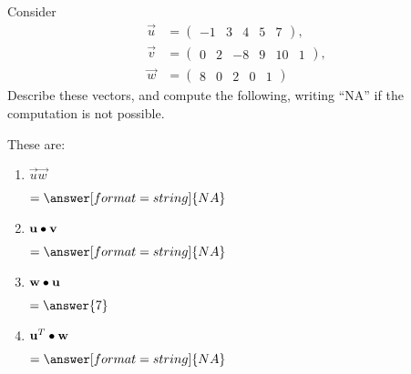 \documentclass{ximera}
\author{Parisa Fatheddin}
\begin{document}
\begin{exercise}

  Consider
  \begin{align*}
    \vec{u} &= \begin{pmatrix} -1 & 3 & 4 & 5 & 7
    \end{pmatrix},\\
    \vec{v} &= \begin{pmatrix}
      0 & 2 & -8 & 9 & 10 & 1
    \end{pmatrix},\\
    \vec{w} &= \begin{pmatrix}
      8 & 0 & 2 & 0 & 1
    \end{pmatrix}
  \end{align*}
  Describe these vectors, and compute the following, writing ``NA'' if the
  computation is not possible.
  \begin{prompt}These are:
    \begin{multipleChoice}
        \pdfOnly{\end{multicols}}
    \end{multipleChoice}
  \end{prompt}
  \begin{enumerate}
    \item $\vec{u}\vec{w}$ \begin{prompt} $= \answer[format=string]{NA}$\end{prompt}
    \item $\mathbf{u} \bullet \mathbf{v}$ \begin{prompt} $= \answer[format=string]{NA}$\end{prompt}
    \item $\mathbf{w} \bullet \mathbf{u}$ \begin{prompt} $= \answer{7}$\end{prompt}
    \item $\mathbf{u}^{T} \bullet \mathbf{w}$ \begin{prompt} $= \answer[format=string]{NA}$\end{prompt}
    \pdfOnly{\end{multicols}}
  \end{enumerate}
\end{exercise}
\end{document}
